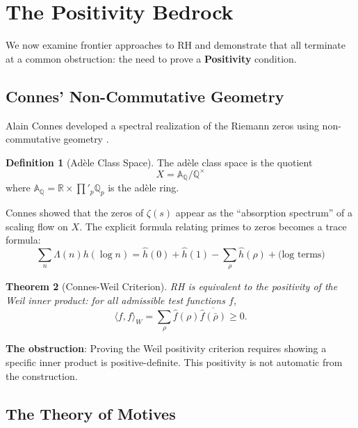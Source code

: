 \documentclass[12pt, a4paper]{article}
\newtheorem{theorem}{Theorem}[section]
\theoremstyle{definition}
\newtheorem{definition}[theorem]{Definition}
\newcommand{\Q}{\mathbb{Q}}
\newcommand{\R}{\mathbb{R}}
\newcommand{\A}{\mathbb{A}}
\begin{document}
\section{The Positivity Bedrock}

We now examine frontier approaches to RH and demonstrate that all terminate at a common obstruction: the need to prove a \textbf{Positivity} condition.

\subsection{Connes' Non-Commutative Geometry}

Alain Connes developed a spectral realization of the Riemann zeros using non-commutative geometry \cite{Connes1999}.

\begin{definition}[Ad\`ele Class Space]
The ad\`ele class space is the quotient
\begin{equation}
X = \A_\Q / \Q^\times
\end{equation}
where $\A_\Q = \R \times \prod'_p \Q_p$ is the ad\`ele ring.
\end{definition}

Connes showed that the zeros of $\zeta(s)$ appear as the ``absorption spectrum'' of a scaling flow on $X$. The explicit formula relating primes to zeros becomes a trace formula:
\begin{equation}
\sum_n \Lambda(n) h(\log n) = \hat{h}(0) + \hat{h}(1) - \sum_\rho \hat{h}(\rho) + \text{(log terms)}
\end{equation}

\begin{theorem}[Connes-Weil Criterion]
RH is equivalent to the positivity of the Weil inner product: for all admissible test functions $f$,
\begin{equation}
\langle f, f \rangle_W = \sum_\rho \hat{f}(\rho) \overline{\hat{f}(\bar{\rho})} \geq 0.
\end{equation}
\end{theorem}

\textbf{The obstruction}: Proving the Weil positivity criterion requires showing a specific inner product is positive-definite. This positivity is not automatic from the construction.

\subsection{The Theory of Motives}
\end{document}
